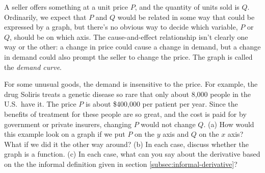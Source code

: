 A seller offers something at a unit price $P$, and the quantity of units
sold is $Q$. Ordinarily, we expect that $P$ and $Q$ would be related in some
way that could be expressed by a graph, but there's no obvious way to decide
which variable, $P$ or $Q$, should be on which axis. The cause-and-effect relationship
isn't clearly one way or the other: a change in price could cause a change in demand,
but a change in demand could also prompt the seller to change the price. 
The graph is called the \emph{demand curve}.

For some
unusual goods, the demand is insensitive to the price. For example, the drug
Soliris treats a genetic disease so rare that only about 8,000 people in the U.S.~have it.
The price $P$ is about \$400,000 per patient per year. Since the benefits
of treatment for these people are so great, and the cost is paid for by government
or private insurers, changing $P$ would not change $Q$. (a) How would this example look
on a graph if we put $P$ on the $y$ axis and $Q$ on the $x$ axis? What if we did
it the other way around? (b) In each case, discuss whether the graph is a function.
(c) In each case, what can you say about
the derivative based on the
the informal definition given in section
\ref{subsec:informal-derivative}?
